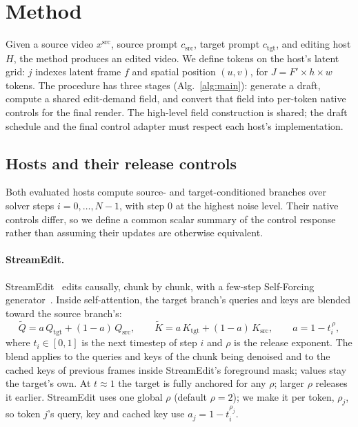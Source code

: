\documentclass[10pt,twocolumn]{article}
\newcommand{\src}{\mathrm{src}}
\newcommand{\tgt}{\mathrm{tgt}}
\begin{document}
\section{Method}
\label{sec:method}

Given a source video $x^{\src}$, source prompt $c_{\src}$, target prompt $c_{\tgt}$, and editing host $H$, the method produces an edited video. We define tokens on the host's latent grid: $j$ indexes latent frame $f$ and spatial position $(u,v)$, for $J=F'\times h\times w$ tokens. The procedure has three stages (Alg.~\ref{alg:main}): generate a draft, compute a shared edit-demand field, and convert that field into per-token native controls for the final render. The high-level field construction is shared; the draft schedule and the final control adapter must respect each host's implementation.

\subsection{Hosts and their release controls}
\label{sec:hosts}

Both evaluated hosts compute source- and target-conditioned branches over solver steps $i=0,\dots,N-1$, with step $0$ at the highest noise level. Their native controls differ, so we define a common scalar summary of the control response rather than assuming their updates are otherwise equivalent.

\paragraph{StreamEdit.}
StreamEdit~\cite{streamedit2026} edits causally, chunk by chunk, with a few-step Self-Forcing generator~\cite{selfforcing2025}. Inside self-attention, the target branch's queries and keys are blended toward the source branch's:
\begin{equation}
\tilde Q = a\,Q_{\tgt} + (1-a)\,Q_{\src},\qquad \tilde K = a\,K_{\tgt} + (1-a)\,K_{\src},\qquad a = 1 - t_{i}^{\,\rho},
\label{eq:se-blend}
\end{equation}
where $t_i\in[0,1]$ is the next timestep of step $i$ and $\rho$ is the release exponent. The blend applies to the queries and keys of the chunk being denoised and to the cached keys of previous frames inside StreamEdit's foreground mask; values stay the target's own. At $t\approx 1$ the target is fully anchored for any $\rho$; larger $\rho$ releases it earlier. StreamEdit uses one global $\rho$ (default $\rho=2$); we make it per token, $\rho_j$, so token $j$'s query, key and cached key use $a_j = 1-t_i^{\rho_j}$.
\end{document}
